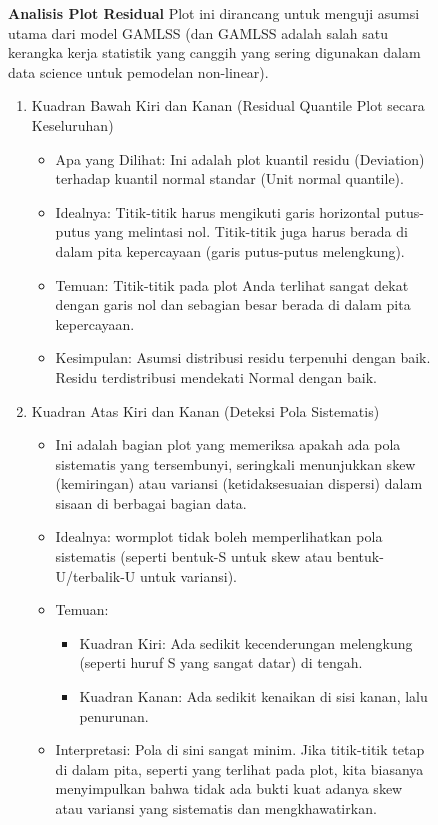 \documentclass[11pt, a4paper]{article}
\begin{document}
\begin{enumerate}
\begin{figure}[H]
\textbf{Analisis Plot Residual}
Plot ini dirancang untuk menguji asumsi utama dari model GAMLSS (dan GAMLSS adalah salah satu kerangka kerja statistik yang canggih yang sering digunakan dalam data science untuk pemodelan non-linear).
\begin{enumerate}
\item Kuadran Bawah Kiri dan Kanan (Residual Quantile Plot secara Keseluruhan)
    \begin{itemize}
    \item Apa yang Dilihat: Ini adalah plot kuantil residu (Deviation) terhadap kuantil normal standar (Unit normal quantile).
    \item Idealnya: Titik-titik harus mengikuti garis horizontal putus-putus yang melintasi nol. Titik-titik juga harus berada di dalam pita kepercayaan (garis putus-putus melengkung).
    \item Temuan: Titik-titik pada plot Anda terlihat sangat dekat dengan garis nol dan sebagian besar berada di dalam pita kepercayaan.
    \item Kesimpulan: Asumsi distribusi residu terpenuhi dengan baik. Residu terdistribusi mendekati Normal dengan baik.
    \end{itemize}
\item Kuadran Atas Kiri dan Kanan (Deteksi Pola Sistematis)
    \begin{itemize}
    \item  Ini adalah bagian plot yang memeriksa apakah ada pola sistematis yang tersembunyi, seringkali menunjukkan skew (kemiringan) atau variansi (ketidaksesuaian dispersi) dalam sisaan di berbagai bagian data.
    \item Idealnya: wormplot tidak boleh memperlihatkan pola sistematis (seperti bentuk-S untuk skew atau bentuk-U/terbalik-U untuk variansi).
    \item Temuan:
        \begin{itemize}
            \item Kuadran Kiri: Ada sedikit kecenderungan melengkung (seperti huruf S yang sangat datar) di tengah.
            \item Kuadran Kanan: Ada sedikit kenaikan di sisi kanan, lalu penurunan.
        \end{itemize}
    \item Interpretasi: Pola di sini sangat minim. Jika titik-titik tetap di dalam pita, seperti yang terlihat pada plot, kita biasanya menyimpulkan bahwa tidak ada bukti kuat adanya skew atau variansi yang sistematis dan mengkhawatirkan.

\end{itemize}
\end{enumerate}
\end{figure}
\end{enumerate}
\end{document}
